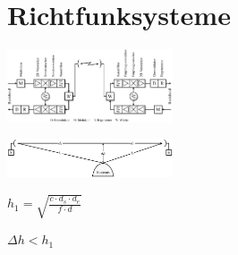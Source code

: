\documentclass[german]{latex4ei/latex4ei_sheet}
\begin{document}
\section{Richtfunksysteme}
    \begin{sectionbox}
        \item \includegraphics[width=185px]{img/Richtfunk.png}
        \item \includegraphics[width=185px]{img/FresnelZone.png}
        \item $h_1 = \sqrt{\frac{c\cdot d_s \cdot d_e}{f\cdot d}}$
        \item $\Delta h < h_1$
    \end{sectionbox}
\end{document}
